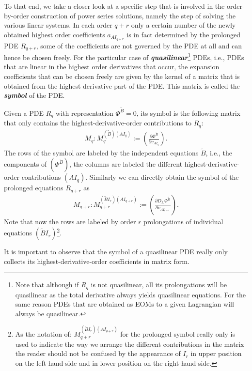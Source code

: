 To that end, we take a closer look at a specific step that is involved in  the order-by-order construction of power series solutions, namely the step of solving the various linear systems.
In each order $q+r$ only a certain number of the newly obtained highest order coefficients $a_{AI_{q+r}}$ is in fact determined by the prolonged PDE $R_{q+r}$, some of the coefficients are not governed by the PDE at all and can hence be chosen freely.
For the particular case of \textit{\textbf{quasilinear}}\footnote{Note that although if $R_q$ is not quasilinear, all its prolongations will be quasilinear as the total derivative always yields quasilinear equations. For the same reason PDEs that are obtained as EOMs to a given Lagrangian will always be quasilinear.} PDEs, i.e., PDEs that are linear in the highest order derivatives that occur, the expansion coefficients that can be chosen freely are given by the kernel of a matrix that is obtained from the highest derivative part of the PDE. This matrix is called the \textit{\textbf{symbol}} of the PDE.
\begin{definition}[symbol]
Given a PDE $R_q$ with representation $\Phi^{\tilde{B}}=0$, its symbol is the following matrix that only contains the highest-derivative-order contributions to $R_q$:
\begin{align}
    M_q : M_q^{(\tilde{B})({AI_q})} := \left ( \frac{\partial \Phi^{\tilde{B}}}{\partial v_{AI_q}} \right ).
\end{align}
The rows of the symbol are labeled by the independent equations $\tilde{B}$, i.e., the components of $(\Phi^{\tilde{B}})$, the columns are labeled the different highest-derivative-order contributions $(AI_q)$.
Similarly we can directly obtain the symbol of the prolonged equations $R_{q+r}$ as
\begin{align}\label{proSym}
    M_{q+r} : M_{q+r} ^{(\tilde{B}I_r) (AI_{q+r})}:= \left ( \frac{\partial D_{I_r}\Phi^{\tilde{B}
    }}{\partial v_{AI_{q+r}}} \right ). 
\end{align}
Note that now the rows are labeled by order $r$ prolongations of individual equations $(\tilde{B}I_r)$\footnote{As the notation of: $M_{q+r} ^{(\tilde{B}I_r) (AI_{q+r})}$ for the prolonged symbol really only is used to indicate the way we arrange the different contributions in the matrix the reader should not be confused by the appearance of $I_r$ in upper position on the left-hand-side and in lower position on the right-hand-side.}.
\end{definition}
It is important to observe that the symbol of a quasilinear PDE really only collects its highest-derivative-order coefficients in matrix form.
